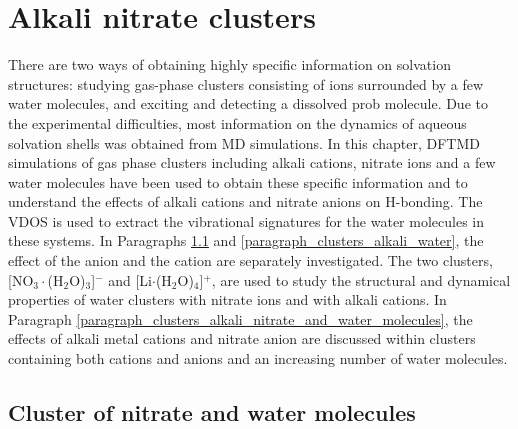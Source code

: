   \chapter{Alkali nitrate clusters}\label{CHAPTER_Clusters}
There are two ways of obtaining highly specific information on solvation structures: studying gas-phase clusters consisting of ions surrounded by a few water molecules\cite{Weber2000,Kropman2001},
and exciting and detecting a dissolved prob molecule\cite{Jimenez1994}.
Due to the experimental difficulties, most information on the dynamics of aqueous solvation shells was obtained from MD simulations\cite{Smith1994,Chandra2000}.
  In this chapter, DFTMD simulations of gas phase clusters including alkali cations, nitrate ions and a few water molecules have been used to obtain these specific information and to understand the
  effects of alkali cations and nitrate anions on H-bonding\cite{jiangling2010,heine2015}. 
  The VDOS is used to extract the vibrational signatures for the water molecules in these systems.
  In Paragraphs \ref{paragraph_3w_nitrate} and \ref{paragraph_clusters_alkali_water}, 
  the effect of the anion and the cation are separately investigated. 
  The two clusters, [NO$_3\cdot$(H$_2$O)$_3$]$^-$ and [Li$\cdot$(H$_2$O)$_4$]$^+$, are used 
  to study the structural and dynamical properties of water clusters with nitrate ions and with alkali cations. 
  In Paragraph \ref{paragraph_clusters_alkali_nitrate_and_water_molecules}, the effects of alkali metal cations 
  and nitrate anion are discussed within clusters containing both cations and anions and an increasing number of water molecules.
  \section{Cluster of nitrate and water molecules}\label{paragraph_3w_nitrate}
  
